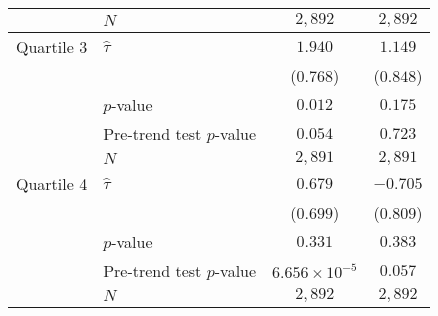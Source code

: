 \begin{table}[tbh]
\begin{tabular}{llcc}
                    & $N$ &                                                              $2,892$ &                                                              $2,892$ \\
\midrule Quartile 3 & $\hat \tau$ &                                                              $1.940$ &                                                              $1.149$ \\
                    &     &                                                            ($0.768$) &                                                            ($0.848$) \\
                    & $p$-value &                                                              $0.012$ &                                                              $0.175$ \\
                    & Pre-trend test $p$-value &                                                              $0.054$ &                                                              $0.723$ \\
                    & $N$ &                                                              $2,891$ &                                                              $2,891$ \\
\midrule Quartile 4 & $\hat \tau$ &                                                              $0.679$ &                                                             $-0.705$ \\
                    &     &                                                            ($0.699$) &                                                            ($0.809$) \\
                    & $p$-value &                                                              $0.331$ &                                                              $0.383$ \\
                    & Pre-trend test $p$-value &                                               $6.656 \times 10^{-5}$ &                                                              $0.057$ \\
                    & $N$ &                                                              $2,892$ &                                                              $2,892$ \\
\bottomrule
\end{tabular}

        \end{table}